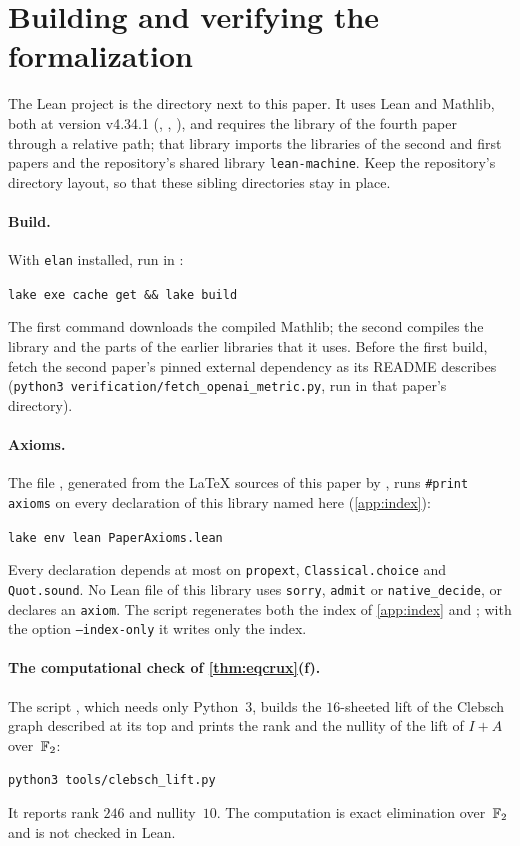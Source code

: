 \section{Building and verifying the formalization}\label{app:verify}

The Lean project is the directory  next to this paper. It uses Lean and Mathlib, both at version v4.34.1
(, , ), and requires the library of the fourth
paper~\cite{FourthPaper2026} through a relative path; that library imports the libraries of the second and first papers and the
repository's shared library \texttt{lean-machine}. Keep the repository's directory layout, so that these sibling directories stay
in place.

\paragraph{Build.} With \texttt{elan} installed, run in :
\begin{center}
\texttt{lake exe cache get \&\& lake build}
\end{center}
The first command downloads the compiled Mathlib; the second compiles the library and the parts of the earlier libraries that it
uses. Before the first build, fetch the second paper's pinned external dependency as its README describes
(\texttt{python3 verification/fetch\_openai\_metric.py}, run in that paper's directory).

\paragraph{Axioms.} The file , generated from the \LaTeX{} sources of this paper by
, runs \texttt{\#print axioms} on every declaration of this library named here (\cref{app:index}):
\begin{center}
\texttt{lake env lean PaperAxioms.lean}
\end{center}
Every declaration depends at most on \texttt{propext}, \texttt{Classical.choice} and \texttt{Quot.sound}. No Lean file of this
library uses \texttt{sorry}, \texttt{admit} or \texttt{native\_decide}, or declares an \texttt{axiom}. The script regenerates both
the index of \cref{app:index} and ; with the option \texttt{--index-only} it writes only the index.

\paragraph{The computational check of \cref{thm:eqcrux}(f).} The script , which needs only
Python~3,
builds the $16$-sheeted lift of the Clebsch graph described at its top and prints the rank and the nullity of the lift of $I+A$
over~$\mathbb{F}_2$:
\begin{center}
\texttt{python3 tools/clebsch\_lift.py}
\end{center}
It reports rank $246$ and nullity~$10$. The computation is exact elimination over~$\mathbb{F}_2$ and is not checked in Lean.

